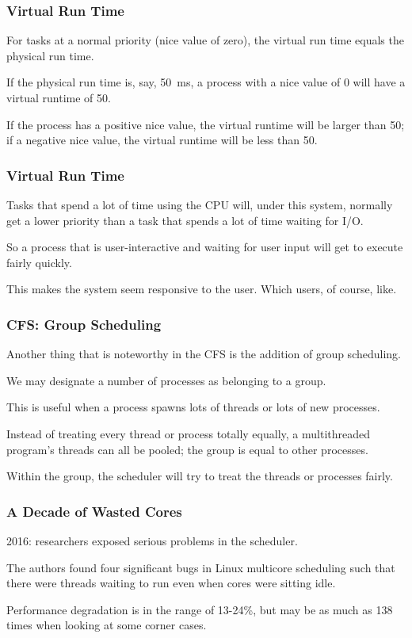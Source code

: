 \begin{frame}
\frametitle{Virtual Run Time}

For tasks at a normal priority (nice value of zero), the virtual run time equals the physical run time. 

If the physical run time is, say, 50~ms, a process with a nice value of 0 will have a virtual runtime of 50. 

If the process has a positive nice value, the virtual runtime will be larger than 50; if a negative nice value, the virtual runtime will be less than 50.

\end{frame}



\begin{frame}
\frametitle{Virtual Run Time}

Tasks that spend a lot of time using the CPU will, under this system, normally get a lower priority than a task that spends a lot of time waiting for I/O.

So a process that is user-interactive and waiting for user input will get to execute fairly quickly.

This makes the system seem responsive to the user. Which users, of course, like.

\end{frame}

\begin{frame}
\frametitle{CFS: Group Scheduling}

Another thing that is noteworthy in the CFS is the addition of group scheduling. 

We may designate a number of processes as belonging to a group. 

This is useful when a process spawns lots of threads or lots of new processes. 

Instead of treating every thread or process totally equally, a multithreaded program's threads can all be pooled; the group is equal to other processes. 

Within the group, the scheduler will try to treat the threads or processes fairly.

\end{frame}




\begin{frame}
\frametitle{A Decade of Wasted Cores}

2016: researchers exposed serious problems in the scheduler. 

The authors found four significant bugs in Linux multicore scheduling such that there were threads waiting to run even when cores were sitting idle. 

Performance degradation is in the range of 13-24\%, but may be as much as 138 times when looking at some corner cases. 

\end{frame}



